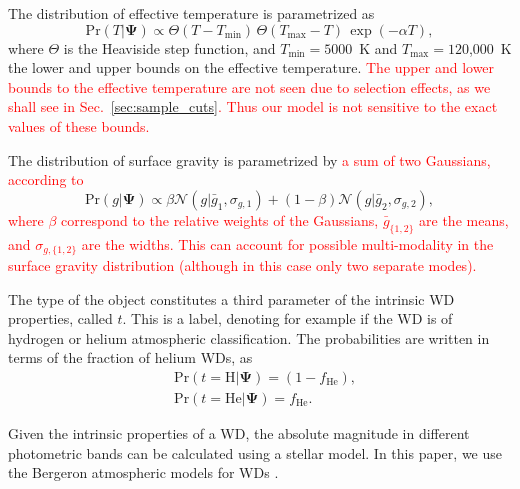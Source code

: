 \documentclass[fleqn,usenatbib]{mnras}
\newcommand{\changes}[1]{\textcolor{red}{#1}}
\newcommand{\popp}{\boldsymbol{\Psi}}
\newcommand{\Teff}{T}
\newcommand{\logg}{g}
\newcommand{\pr}{\text{Pr}}
\begin{document}
The distribution of effective temperature is parametrized as
\begin{equation}\label{eq:T}
    \pr(\Teff | \popp) \propto \Theta(\Teff - \Teff_\text{min})\, \Theta(\Teff_\text{max} - \Teff) \, \exp (-\alpha \Teff),
\end{equation}
where $\Theta$ is the Heaviside step function, and $\Teff_\text{min}=5000$~K and $\Teff_\text{max}=120$,000~K the lower and upper bounds on the effective temperature. \changes{The upper and lower bounds to the effective temperature are not seen due to selection effects, as we shall see in Sec.~\ref{sec:sample_cuts}. Thus our model is not sensitive to the exact values of these bounds.}

The distribution of surface gravity is parametrized by \changes{a sum of two Gaussians, according to}
\begin{equation}\label{eq:T&g}
    \pr(\logg | \popp) \propto \beta \mathcal{N}(\logg | \bar{g}_1, \sigma_{g,1}) +
    (1-\beta) \mathcal{N}(\logg | \bar{g}_2, \sigma_{g,2}),
\end{equation}
\changes{where $\beta$ correspond to the relative weights of the Gaussians, $\bar{g}_{\{1,2\}}$ are the means, and $\sigma_{g,\{1,2\}}$ are the widths. This can account for possible multi-modality in the surface gravity distribution (although in this case only two separate modes).}

The type of the object constitutes a third parameter of the intrinsic WD properties, called $t$. This is a label, denoting for example if the WD is of hydrogen or helium atmospheric classification. The probabilities are written in terms of the fraction of helium WDs, as
\begin{equation}\label{eq:DADB}
\begin{split}
	& \pr(t=\text{H} | \popp) = (1-f_\text{He}),\\
	& \pr(t=\text{He} | \popp) = f_\text{He}.
\end{split}
\end{equation}

Given the intrinsic properties of a WD, the absolute magnitude in different photometric bands can be calculated using a stellar model. In this paper, we use the Bergeron atmospheric models for WDs \citep{Bergeron:1995we,Finley:1997zz,Bergeron:2000ce,2001PASP..113..409F}.
\end{document}
